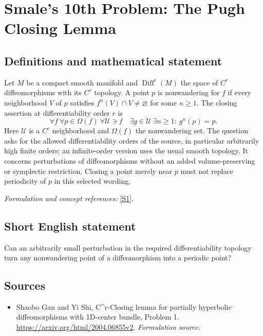 \documentclass[11pt]{article}
\begin{document}
\section*{\texorpdfstring{Smale's 10th Problem: The Pugh Closing Lemma}{Smale's 10th Problem: The Pugh Closing Lemma}}\label{53}
\subsection{Definitions and mathematical statement}
Let $M$ be a compact smooth manifold and $\operatorname{Diff}^r(M)$ the space of $C^r$ diffeomorphisms with its $C^r$ topology. A point $p$ is nonwandering for $f$ if every neighborhood $V$ of $p$ satisfies $f^n(V)\cap V\ne\varnothing$ for some $n\ge1$. The closing assertion at differentiability order $r$ is
\[
 \forall f\ \forall p\in\Omega(f)\ \forall\mathcal U\ni f
 \quad\exists g\in\mathcal U\ \exists n\ge1:\ g^n(p)=p.
\]
Here $\mathcal U$ is a $C^r$ neighborhood and $\Omega(f)$ the nonwandering set. The question asks for the allowed differentiability orders of the source, in particular arbitrarily high finite orders; an infinite-order version uses the usual smooth topology. It concerns perturbations of diffeomorphisms without an added volume-preserving or symplectic restriction. Closing a point merely near $p$ must not replace periodicity of $p$ in this selected wording.
\par\smallskip\textit{Formulation and concept references:} \href{https://arxiv.org/html/2004.06855v2}{[S1]}.

\subsection{Short English statement}
Can an arbitrarily small perturbation in the required differentiability topology turn any nonwandering point of a diffeomorphism into a periodic point?
\subsection{Sources}
\begin{itemize}
\item[S1]Shaobo Gan and Yi Shi, C\textasciicircum{}r-Closing lemma for partially hyperbolic diffeomorphisms with 1D-center bundle, Problem 1.
\url{https://arxiv.org/html/2004.06855v2}.
\textit{Formulation source.}
\end{itemize}
\end{document}
